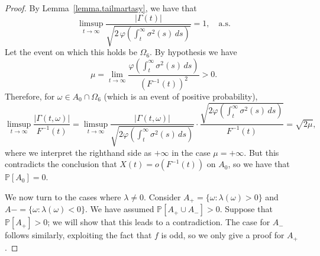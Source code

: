 \documentclass[10pt,a4paper]{amsart}
\begin{document}
\begin{proof}
		By Lemma~\ref{lemma.tailmartasy}, we have that
		\[
		\limsup_{t \to \infty} 
		\frac{|\Gamma(t)|}{\sqrt{2 \, \varphi\!\left(\int_t^\infty \sigma^2(s)\, ds\right)}} 
		= 1, 
		\quad \text{a.s.}
		\]
		Let the event on which this holds be $\Omega_6$. By hypothesis we have  
		\[
		\mu = \lim_{t \to \infty} \frac{\varphi\!\left(\int_t^\infty \sigma^2(s)\, ds \right)}{(F^{-1}(t))^2} > 0.
		\]
		Therefore, for $\omega \in A_0 \cap \Omega_6$ (which is an event of positive probability),
		\[
		\limsup_{t \to \infty} \frac{|\Gamma(t,\omega)|}{F^{-1}(t)}
		= \limsup_{t \to \infty} \frac{|\Gamma(t,\omega)|}
		{\sqrt{2 \varphi\!\left(\int_t^\infty \sigma^2(s)\, ds\right)}} 
		\cdot
		\frac{\sqrt{2 \varphi\!\left(\int_t^\infty \sigma^2(s)\, ds\right)}}{F^{-1}(t)}=\sqrt{2\mu},
		\]
		where we interpret the righthand side as $+\infty$ in the case $\mu=+\infty$. But this contradicts the conclusion that $X(t)=o(F^{-1}(t))$ on $A_0$, so we have that $\mathbb{P}[A_0]=0$. 
		
		We now turn to the cases where $\lambda\neq 0$. Consider $A_+=\{\omega:\lambda(\omega)>0\}$ and $A-=\{ \omega:\lambda(\omega)<0\}$. We have assumed $\mathbb{P}[A_+\cup A_-]>0$. Suppose that $\mathbb{P}[A_+]>0$; we will show that this leads to a contradiction. The case for $A_-$ follows similarly, exploiting the fact that $f$ is odd, so we only give a proof for $A_+$. 
		

\end{proof}
\end{document}
